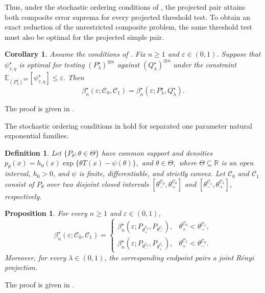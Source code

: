 \documentclass[journal,10pt,draftclsnofoot,onecolumn]{IEEEtran}
\newtheorem{corollary}{Corollary}
\newtheorem{proposition}{Proposition}
\newtheorem{definition}{Definition}
\begin{document}
Thus, under the stochastic ordering conditions of , the projected pair attains both composite error suprema for every projected threshold test. To obtain an exact reduction of the unrestricted composite problem, the same threshold test must also be optimal for the projected simple pair.

\begin{corollary}
\label{cor:projected-exact-reduction}
Assume the conditions of . Fix $n\geq1$ and $\varepsilon\in(0,1)$. Suppose that $\psi_{\tau,\eta}^\star$ is optimal for testing $(P_\lambda^\star)^{\otimes n}$ against $(Q_\lambda^\star)^{\otimes n}$ under the constraint $\mathbb E_{(P_\lambda^\star)^{\otimes n}}[\psi_{\tau,\eta}^\star]\leq\varepsilon.$ Then
\begin{equation*}
\beta_n^\star(\varepsilon;\mathcal C_0,\mathcal C_1)=\beta_n^\star(\varepsilon;P_\lambda^\star,Q_\lambda^\star).
\end{equation*}
\end{corollary}
The proof is given in .

The stochastic ordering conditions in
 hold for separated one parameter natural
exponential families.

\begin{definition}
Let $\{P_\theta:\theta\in\Theta\}$ have common support and densities $p_\theta(x) = h_0(x)\exp\{\theta T(x)-\psi(\theta)\},$ and $\theta\in\Theta,$ where $\Theta\subseteq\mathbb R$ is an open interval, $h_0>0$, and $\psi$ is finite, differentiable, and strictly convex. Let $\mathcal C_0$ and $\mathcal C_1$ consist of $P_\theta$ over two disjoint closed intervals
$[\theta_-^{\mathcal C_0},\theta_+^{\mathcal C_0}]$ and
$[\theta_-^{\mathcal C_1},\theta_+^{\mathcal C_1}]$, respectively.
\end{definition}

\begin{proposition}
\label{prop:endpoint-reduction}
For every $n\geq1$ and $\varepsilon\in(0,1)$,
\begin{equation*} 
\beta_n^\star(\varepsilon;\mathcal C_0,\mathcal C_1) = 
\begin{cases} \beta_n^\star\left( \varepsilon; P_{\theta_+^{\mathcal C_0}}, P_{\theta_-^{\mathcal C_1}} \right), & \theta_+^{\mathcal C_0}<\theta_-^{\mathcal C_1}, \\[1ex] \beta_n^\star\left( \varepsilon; P_{\theta_-^{\mathcal C_0}}, P_{\theta_+^{\mathcal C_1}} \right), & \theta_+^{\mathcal C_1}<\theta_-^{\mathcal C_0}. 
\end{cases}
\end{equation*}
Moreover, for every $\lambda\in(0,1)$, the corresponding endpoint pairs a joint R\'enyi projection.
\end{proposition}
The proof is given in .
\end{document}

